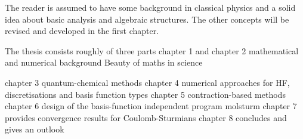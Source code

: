 



The reader is assumed to have some background in classical physics
and a solid idea about basic analysis and algebraic structures.
The other concepts will be revised and developed in the first chapter.

The thesis consists roughly of three parts
chapter 1 and chapter 2 mathematical and numerical background
Beauty of maths in science

chapter 3 quantum-chemical methods
chapter 4 numerical approaches for HF, discretisations and basis function types
chapter 5 contraction-based methods
chapter 6 design of the basis-function independent program molsturm
chapter 7 provides convergence results for Coulomb-Sturmians
chapter 8 concludes and gives an outlook
